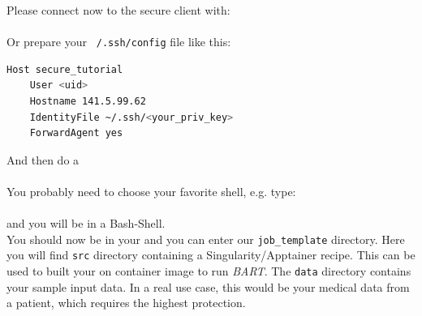 \documentclass[paper=a4]{scrartcl}
\begin{document}
Please connect now to the secure client with:\\
\\
Or prepare your \texttt{~/.ssh/config} file like this: \\
\begin{lstlisting}[language=bash, caption=~/.ssh/config] 
Host secure_tutorial
	User <uid>
	Hostname 141.5.99.62
	IdentityFile ~/.ssh/<your_priv_key>
	ForwardAgent yes
\end{lstlisting}
And then do a\\
 \\
You probably need to choose your favorite shell, e.g. type: \\
 \\
and you will be in a Bash-Shell. \\
You should now be in your  and you can enter our \texttt{job\_template} directory. 
Here you will find \texttt{src} directory containing a Singularity/Apptainer recipe. 
This can be used to built your on container image to run \textit{BART}. 
The \texttt{data} directory contains your sample input data. 
In a real use case, this would be your medical data from a patient, which requires the highest protection. 
\end{document}

